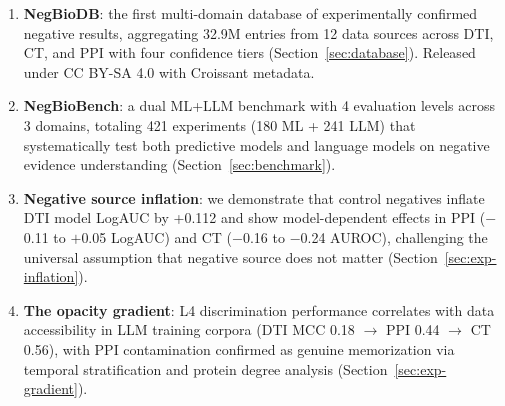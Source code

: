 \begin{enumerate}[nosep,leftmargin=*]
    \item \textbf{NegBioDB}: the first multi-domain database of experimentally confirmed negative results, aggregating 32.9M entries from 12 data sources across DTI, CT, and PPI with four confidence tiers (Section~\ref{sec:database}). Released under CC BY-SA 4.0 with Croissant metadata.

    \item \textbf{NegBioBench}: a dual ML+LLM benchmark with 4 evaluation levels across 3 domains, totaling 421 experiments (180 ML + 241 LLM) that systematically test both predictive models and language models on negative evidence understanding (Section~\ref{sec:benchmark}).

    \item \textbf{Negative source inflation}: we demonstrate that control negatives inflate DTI model LogAUC by +0.112 and show model-dependent effects in PPI ($-$0.11 to $+$0.05 LogAUC) and CT ($-$0.16 to $-$0.24 AUROC), challenging the universal assumption that negative source does not matter (Section~\ref{sec:exp-inflation}).

    \item \textbf{The opacity gradient}: L4 discrimination performance correlates with data accessibility in LLM training corpora (DTI MCC 0.18 $\to$ PPI 0.44 $\to$ CT 0.56), with PPI contamination confirmed as genuine memorization via temporal stratification and protein degree analysis (Section~\ref{sec:exp-gradient}).
\end{enumerate}

